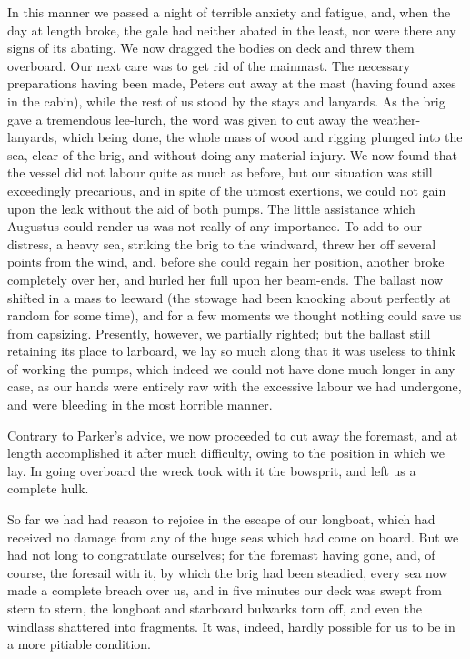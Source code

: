 In this manner we passed a night of terrible anxiety and fatigue, and, when
the day at length broke, the gale had neither abated in the least, nor were
there any signs of its abating. We now dragged the bodies on deck and threw them
overboard. Our next care was to get rid of the mainmast. The necessary
preparations having been made, Peters cut away at the mast (having found axes in
the cabin), while the rest of us stood by the stays and lanyards. As the brig
gave a tremendous lee-lurch, the word was given to cut away the
weather-lanyards, which being done, the whole mass of wood and rigging plunged
into the sea, clear of the brig, and without doing any material injury. We now
found that the vessel did not labour quite as much as before, but our situation
was still exceedingly precarious, and in spite of the utmost exertions, we could
not gain upon the leak without the aid of both pumps. The little assistance
which Augustus could render us was not really of any importance. To add to our
distress, a heavy sea, striking the brig to the windward, threw her off several
points from the wind, and, before she could regain her position, another broke
completely over her, and hurled her full upon her beam-ends. The ballast now
shifted in a mass to leeward (the stowage had been knocking about perfectly at
random for some time), and for a few moments we thought nothing could save us
from capsizing. Presently, however, we partially righted; but the ballast still
retaining its place to larboard, we lay so much along that it was useless to
think of working the pumps, which indeed we could not have done much longer in
any case, as our hands were entirely raw with the excessive labour we had
undergone, and were bleeding in the most horrible manner. 

Contrary to Parker's advice, we now proceeded to cut away the foremast, and
at length accomplished it after much difficulty, owing to the position in which
we lay. In going overboard the wreck took with it the bowsprit, and left us a
complete hulk. 

So far we had had reason to rejoice in the escape of our longboat, which had
received no damage from any of the huge seas which had come on board. But we had
not long to congratulate ourselves; for the foremast having gone, and, of
course, the foresail with it, by which the brig had been steadied, every sea now
made a complete breach over us, and in five minutes our deck was swept from
stern to stern, the longboat and starboard bulwarks torn off, and even the
windlass shattered into fragments. It was, indeed, hardly possible for us to be
in a more pitiable condition. 


